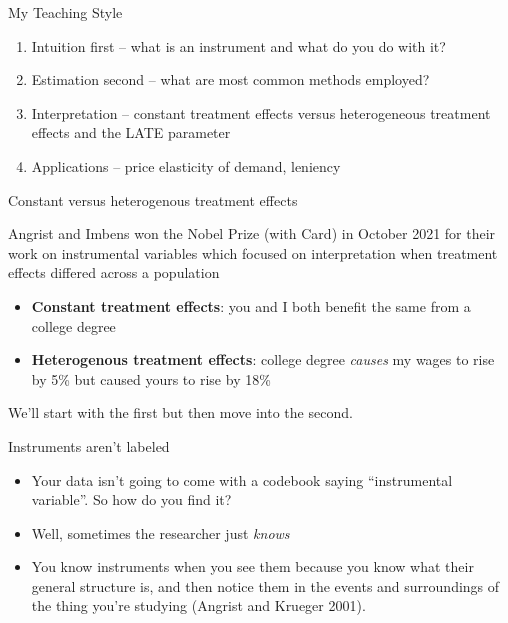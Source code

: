 \documentclass{beamer}
\begin{document}
\begin{frame}{My Teaching Style}

\begin{enumerate}
\item Intuition first -- what is an instrument and what do you do with it?
\item Estimation second -- what are most common methods employed?
\item Interpretation -- constant treatment effects versus heterogeneous treatment effects and the LATE parameter
\item Applications -- price elasticity of demand, leniency
\end{enumerate}

\end{frame}

\begin{frame}{Constant versus heterogenous treatment effects}

Angrist and Imbens won the Nobel Prize (with Card) in October 2021 for their work on instrumental variables which focused on interpretation when treatment effects differed across a population

\begin{itemize}
\item \textbf{Constant treatment effects}: you and I both benefit the same from a college degree
\item \textbf{Heterogenous treatment effects}: college degree \emph{causes} my wages to rise by 5\% but caused yours to rise by 18\%
\end{itemize}

\bigskip

We'll start with the first but then move into the second.

\end{frame}


\begin{frame}{Instruments aren't labeled}

	\begin{itemize}
	\item Your data isn't going to come with a codebook saying ``instrumental variable''.  So how do you find it?
	\item Well, sometimes the researcher just \emph{knows}
	\item You know instruments when you see them because you know what their general structure is, and then notice them in the events and surroundings of the thing you're studying (Angrist and Krueger 2001).  
	\end{itemize}
\end{frame}
\end{document}
